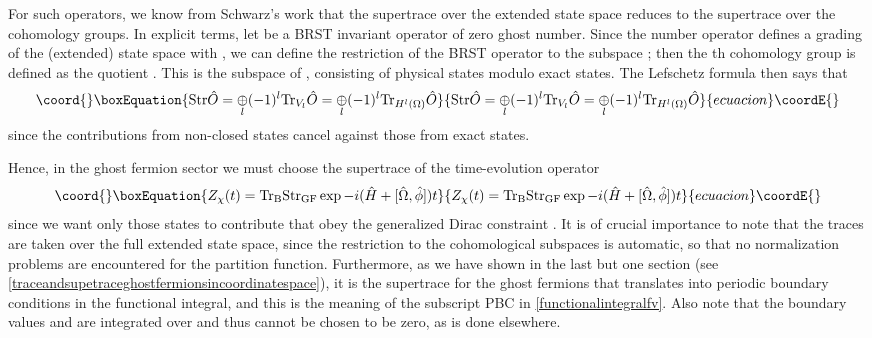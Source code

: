 \documentclass[a4paper,10pt]{article}
\begin{document}
For such operators, we know from Schwarz's work \cite{Schw 89} that the supertrace over 
the extended state space reduces to the supertrace over the cohomology groups. In explicit 
terms, let \coordHE{} be a BRST invariant operator of zero ghost number. Since the number 
operator defines a grading of the (extended) state space \coordHE{} with \coordHE{}, we can define the restriction \coordHE{} of the BRST operator to the 
subspace \coordHE{}; then the \coordHE{}th cohomology group is defined as the quotient 
\coordHE{}. This is the 
subspace of \coordHE{}, consisting of physical states \coordHE{} modulo exact states. The 
Lefschetz formula \cite{Schw 89} then says that
\begin{equation}\coord{}\boxEquation{
\mathrm{Str}\hat{O}=\underset{l}{\oplus}(-
1)^l\mathrm{Tr}_{V_l}\hat{O}=\underset{l}{\oplus}(-1)^l\mathrm{Tr}_{H^l(\Omega)}\hat{O}
}{
\mathrm{Str}\hat{O}=\underset{l}{\oplus}(-
1)^l\mathrm{Tr}_{V_l}\hat{O}=\underset{l}{\oplus}(-1)^l\mathrm{Tr}_{H^l(\Omega)}\hat{O}
}{ecuacion}\coordE{}\end{equation}
since the contributions from non-closed states cancel against those from exact 
states.

Hence, in the ghost fermion sector we must choose the supertrace of the time-evolution 
operator
\begin{equation}\coord{}\boxEquation{
Z_{\chi}(t)=\mathrm{Tr}_{\mathrm{B}}\mathrm{Str}_{\mathrm{GF}}\exp -
i(\hat{H}+[\hat{\Omega},\hat{\phi}])t
}{
Z_{\chi}(t)=\mathrm{Tr}_{\mathrm{B}}\mathrm{Str}_{\mathrm{GF}}\exp -
i(\hat{H}+[\hat{\Omega},\hat{\phi}])t
}{ecuacion}\coordE{}\end{equation}
since we want only those states to contribute that obey the generalized Dirac constraint 
\coordHE{}. It is of crucial importance to note 
that the traces are taken over the full extended state space, since the restriction to 
the cohomological subspaces is automatic, so that no normalization problems are 
encountered for the partition function. Furthermore, as we have shown in the last but one 
section (see \eqref{traceandsupetraceghostfermionsincoordinatespace}), it is the 
supertrace for the ghost fermions that translates into periodic boundary conditions in 
the functional integral, and this is the meaning of the subscript PBC in 
\eqref{functionalintegralfv}. Also note that the boundary values 
\coordHE{} and 
\coordHE{} are integrated over and thus 
cannot be chosen to be zero, as is done elsewhere.
\end{document}
